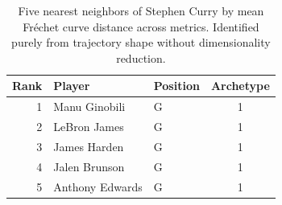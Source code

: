 \begin{table}[htbp]
  \centering\small
  \begin{tabular}{rllc}
    \toprule
    Rank & Player & Position & Archetype \\
    \midrule
    1 & Manu Ginobili & G & 1 \\
    2 & LeBron James & G & 1 \\
    3 & James Harden & G & 1 \\
    4 & Jalen Brunson & G & 1 \\
    5 & Anthony Edwards & G & 1 \\
    \bottomrule
  \end{tabular}
  \caption{Five nearest neighbors of Stephen Curry by mean Fr\'{e}chet curve distance across metrics. Identified purely from trajectory shape without dimensionality reduction.}
  \label{tab:Stephen_Curry_frechet_curve_neighbors}
\end{table}

